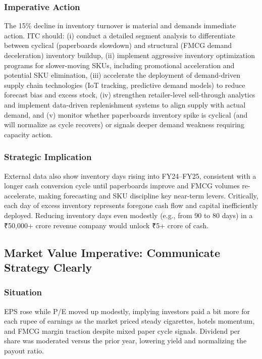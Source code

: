 \documentclass[12pt, a4paper]{report}
\begin{document}
\subsubsection{Imperative Action}
The 15\% decline in inventory turnover is material and demands immediate action. ITC should: (i) conduct a detailed segment analysis to differentiate between cyclical (paperboards slowdown) and structural (FMCG demand deceleration) inventory buildup, (ii) implement aggressive inventory optimization programs for slower-moving SKUs, including promotional acceleration and potential SKU elimination, (iii) accelerate the deployment of demand-driven supply chain technologies (IoT tracking, predictive demand models) to reduce forecast bias and excess stock, (iv) strengthen retailer-level sell-through analytics and implement data-driven replenishment systems to align supply with actual demand, and (v) monitor whether paperboards inventory spike is cyclical (and will normalize as cycle recovers) or signals deeper demand weakness requiring capacity action.

\subsubsection{Strategic Implication}
External data also show inventory days rising into FY24–FY25, consistent with a longer cash conversion cycle until paperboards improve and FMCG volumes re-accelerate, making forecasting and SKU discipline key near-term levers. Critically, each day of excess inventory represents foregone cash flow and capital inefficiently deployed. Reducing inventory days even modestly (e.g., from 90 to 80 days) in a ₹50,000+ crore revenue company would unlock ₹5+ crore of cash.

\subsection{Market Value Imperative: Communicate Strategy Clearly}

\subsubsection{Situation}
EPS rose while P/E moved up modestly, implying investors paid a bit more for each rupee of earnings as the market priced steady cigarettes, hotels momentum, and FMCG margin traction despite mixed paper cycle signals. Dividend per share was moderated versus the prior year, lowering yield and normalizing the payout ratio.
\end{document}
